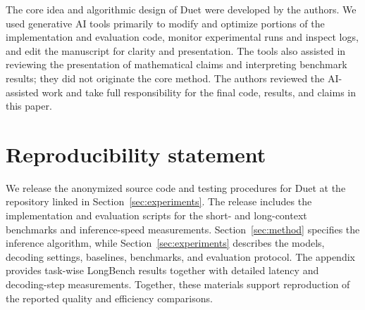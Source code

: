 \documentclass{article}
\begin{document}
The core idea and algorithmic design of Duet were developed by the authors.
We used generative AI tools primarily to modify and optimize portions of
the implementation and evaluation code, monitor experimental runs and
inspect logs, and edit the manuscript for clarity and presentation. The
tools also assisted in reviewing the presentation of mathematical claims
and interpreting benchmark results; they did not originate the core method.
The authors reviewed the AI-assisted work and take full responsibility
for the final code, results, and claims in this paper.




\section*{Reproducibility statement}

We release the anonymized source code and testing procedures for Duet at the
repository linked in Section~\ref{sec:experiments}. The release includes the
implementation and evaluation scripts for the short- and long-context
benchmarks and inference-speed measurements. Section~\ref{sec:method}
specifies the inference algorithm, while Section~\ref{sec:experiments}
describes the models, decoding settings, baselines, benchmarks, and evaluation
protocol. The appendix provides task-wise LongBench results together with
detailed latency and decoding-step measurements.
Together, these materials support reproduction of the reported quality and
efficiency comparisons.

\clearpage




\end{document}

